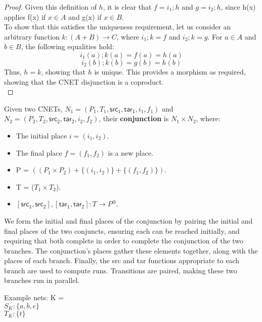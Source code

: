 \begin {proof}
Given this definition of $h$, it is clear that $f = i_1;h$ and $g = i_2;h$, since h(x) applies f(x) if $x \in A$ and g(x) if $x \in B$.\\
To show that this satisfies the uniqueness requirement, let us consider an arbitrary function $k : (A+B) \to C$, where $i_1;k = f$ and $i_2;k = g$. For $a\in A$ and $b\in B$, the following equalities hold:\\ 
\begin{equation}
i_1(a);k(a) = f(a) = h(a) 
\end {equation}
\begin{equation}
i_2(b);k(b) = g(b) = h(b)
\end{equation}
Thus, $h = k$, showing that $h$ is unique. 
This provides a morphism as required, showing that the CNET disjunction is a coproduct.  
\bigskip\\
\end{proof}
\begin{definition}
  \label{def:AND-PN}
  Given two CNETs, $N_1= (P_1, T_1, \mathsf{src_1}, \mathsf{tar_1}, i_1, f_1)$ and $N_2= (P_2, T_2, \mathsf{src_2}, \mathsf{tar_2}, i_2, f_2)$, their \textbf{conjunction} is $N_1 \times N_2$, where: 
\begin{itemize}
\item The initial place $i = (i_1 , i_2)$.
\item The final place $f = (f_1, f_2)$ is a new place.
\item P = $((P_1 \times P_2) + \{(i_1 , i_2)\} + \{(f_1, f_2)\})$.
\item T = ($T_1 \times T_2$).
\item $[\mathsf{src_1}, \mathsf{src_2}], [\mathsf{tar_1}, \mathsf{tar_2}]: T\to P^\oplus$. 
\end{itemize}
We form the initial and final places of the conjunction by pairing the initial and final places of the two conjuncts, ensuring each can be reached initially, and requiring that both complete in order to complete the conjunction of the two branches. The conjunction's places gather these elements together, along with the places of each branch. Finally, the src and tar functions appropriate to each branch are used to compute runs. Transitions are paired, making these two branches run in parallel.   
\end{definition}
\newpage
Example nets:
%
K = \\
$S_K :\{ a, b, c\}$\\
$T_K :\{t\}$\\  
